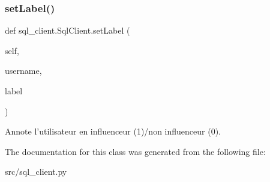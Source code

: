 \subsubsection{\texorpdfstring{set\+Label()}{setLabel()}}
{\footnotesize\ttfamily def sql\+\_\+client.\+Sql\+Client.\+set\+Label (\begin{DoxyParamCaption}\item[{}]{self,  }\item[{}]{username,  }\item[{}]{label }\end{DoxyParamCaption})}

\begin{DoxyVerb}Annote l'utilisateur en influenceur (1)/non influenceur (0).
\end{DoxyVerb}
 

The documentation for this class was generated from the following file\+:\begin{DoxyCompactItemize}
\item 
src/sql\+\_\+client.\+py\end{DoxyCompactItemize}
